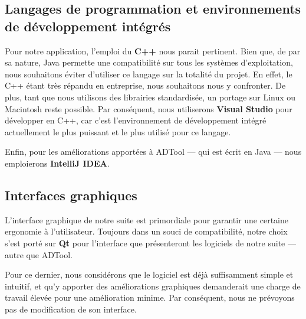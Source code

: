     \subsection{Langages de programmation et environnements de développement intégrés}
        Pour notre application, l'emploi du {\bf C++} nous parait pertinent. Bien que, de par sa nature, Java permette une compatibilité sur tous les systèmes d'exploitation, nous souhaitons éviter d'utiliser ce langage sur la totalité du projet. En effet, le C++ étant très répandu en entreprise, nous souhaitons nous y confronter. De plus, tant que nous utilisons des librairies standardisée, un portage sur Linux ou Macintosh reste possible. Par conséquent, nous utiliserons {\bf Visual Studio} pour développer en C++, car c'est l'environnement de développement intégré actuellement le plus puissant et le plus utilisé  pour ce langage.
        
        Enfin, pour les améliorations apportées à ADTool --- qui est écrit en Java --- nous emploierons {\bf IntelliJ IDEA}.

    \subsection{Interfaces graphiques}
        L'interface graphique de notre suite est primordiale pour garantir une certaine ergonomie à l'utilisateur. Toujours dans un souci de compatibilité, notre choix s'est porté sur {\bf Qt} pour l'interface que présenteront les logiciels de notre suite --- autre que ADTool. 
        
        Pour ce dernier, nous considérons que le logiciel est déjà suffisamment simple et intuitif, et qu'y apporter des améliorations graphiques demanderait une charge de travail élevée pour une amélioration minime. Par conséquent, nous ne prévoyons pas de modification de son interface.

